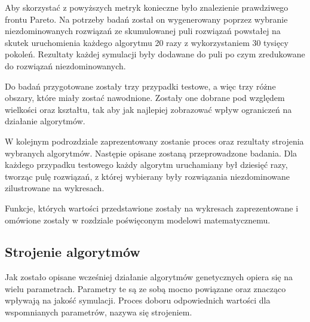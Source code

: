 \documentclass[twoside]{iisthesis}
\begin{document}
Aby skorzystać z powyższych metryk konieczne było znalezienie prawdziwego frontu Pareto. Na potrzeby badań został on wygenerowany poprzez wybranie niezdominowanych rozwiązań ze skumulowanej puli rozwiązań powstałej na skutek uruchomienia każdego algorytmu 20 razy z wykorzystaniem 30 tysięcy pokoleń. Rezultaty każdej symulacji były dodawane do puli po czym zredukowane do rozwiązań niezdominowanych.

Do badań przygotowane zostały trzy przypadki testowe, a więc trzy różne obszary, które miały zostać nawodnione. Zostały one dobrane pod względem wielkości oraz kształtu, tak aby jak najlepiej zobrazować wpływ ograniczeń na działanie algorytmów.

W kolejnym podrozdziale zaprezentowany zostanie proces oraz rezultaty strojenia wybranych algorytmów. Następie opisane zostaną przeprowadzone badania. Dla każdego przypadku testowego każdy algorytm uruchamiany był dziesięć razy, tworząc pulę rozwiązań, z której wybierany były rozwiązania niezdominowane zilustrowane na wykresach.

Funkcje, których wartości przedstawione zostały na wykresach zaprezentowane i omówione zostały w rozdziale poświęconym modelowi matematycznemu.
\subsection{Strojenie algorytmów}
Jak zostało opisane wcześniej działanie algorytmów genetycznych opiera się na wielu parametrach. Parametry te są ze sobą mocno powiązane oraz znacząco wpływają na jakość symulacji. Proces doboru odpowiednich wartości dla wspomnianych parametrów, nazywa się strojeniem.
\end{document}
